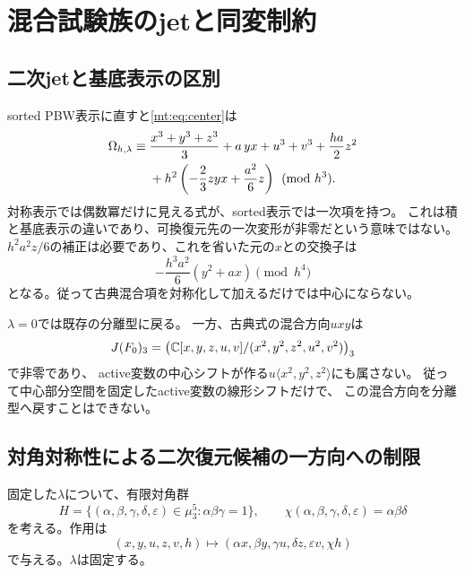 
\section{混合試験族のjetと同変制約}
\subsection{二次jetと基底表示の区別}

sorted PBW表示に直すと\eqref{mt:eq:center}は
\begin{align}\label{mt:eq:second-jet}
 \Omega_{h,\lambda}\equiv{}&
 \frac{x^3+y^3+z^3}{3}+a\,yx+u^3+v^3
 +\frac{ha}{2}z^2\notag\\
 &+h^2\left(-\frac23zyx+\frac{a^2}{6}z\right)
 \pmod{h^3}.
\end{align}
対称表示では偶数冪だけに見える式が、sorted表示では一次項を持つ。
これは積と基底表示の違いであり、可換復元先の一次変形が非零だという意味ではない。
$h^2a^2z/6$の補正は必要であり、これを省いた元の$x$との交換子は
\[
 -\frac{h^3a^2}{6}(y^2+ax)\pmod{h^4}
\]
となる。従って古典混合項を対称化して加えるだけでは中心にならない。

$\lambda=0$では既存の分離型に戻る。
一方、古典式の混合方向$uxy$は
\[
 J(F_0)_3=\bigl(\mathbb C[x,y,z,u,v]/(x^2,y^2,z^2,u^2,v^2)\bigr)_3
\]
で非零であり、
active変数の中心シフトが作る$u\langle x^2,y^2,z^2\rangle$にも属さない。
従って中心部分空間を固定したactive変数の線形シフトだけで、
この混合方向を分離型へ戻すことはできない。

\subsection{対角対称性による二次復元候補の一方向への制限}

固定した$\lambda$について、有限対角群
\[
 H=\{(\alpha,\beta,\gamma,\delta,\varepsilon)\in\mu_3^5:
       \alpha\beta\gamma=1\},\qquad
 \chi(\alpha,\beta,\gamma,\delta,\varepsilon)=\alpha\beta\delta
\]
を考える。作用は
\[
 (x,y,u,z,v,h)\longmapsto
 (\alpha x,\beta y,\gamma u,\delta z,\varepsilon v,\chi h)
\]
で与える。$\lambda$は固定する。

